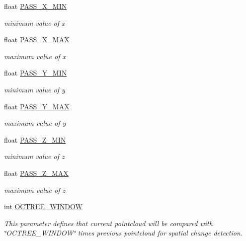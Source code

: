 \begin{DoxyCompactItemize}
float \hyperlink{classdatmo_1_1cloud__segmentation_a503bba212f9c15b767d512771b1559c2}{P\+A\+S\+S\+\_\+\+X\+\_\+\+M\+IN}
\begin{DoxyCompactList}\small\item\em minimum value of x \end{DoxyCompactList}\item 
float \hyperlink{classdatmo_1_1cloud__segmentation_a12f8209c6640d67c23cac18b2d8b7964}{P\+A\+S\+S\+\_\+\+X\+\_\+\+M\+AX}
\begin{DoxyCompactList}\small\item\em maximum value of x \end{DoxyCompactList}\item 
float \hyperlink{classdatmo_1_1cloud__segmentation_af95645fb925c485f397321d6e07c4574}{P\+A\+S\+S\+\_\+\+Y\+\_\+\+M\+IN}
\begin{DoxyCompactList}\small\item\em minimum value of y \end{DoxyCompactList}\item 
float \hyperlink{classdatmo_1_1cloud__segmentation_abacc76df1e25e42d25c1822c2637fa00}{P\+A\+S\+S\+\_\+\+Y\+\_\+\+M\+AX}
\begin{DoxyCompactList}\small\item\em maximum value of y \end{DoxyCompactList}\item 
float \hyperlink{classdatmo_1_1cloud__segmentation_acb71ade7e486ad1cafe15c441903f3e0}{P\+A\+S\+S\+\_\+\+Z\+\_\+\+M\+IN}
\begin{DoxyCompactList}\small\item\em minimum value of z \end{DoxyCompactList}\item 
float \hyperlink{classdatmo_1_1cloud__segmentation_a05b70936af05654abb9b1924ab593d08}{P\+A\+S\+S\+\_\+\+Z\+\_\+\+M\+AX}
\begin{DoxyCompactList}\small\item\em maximum value of z \end{DoxyCompactList}\item 
int \hyperlink{classdatmo_1_1cloud__segmentation_ada1c6bd7f69249c5317cbe95969498e4}{O\+C\+T\+R\+E\+E\+\_\+\+W\+I\+N\+D\+OW}
\begin{DoxyCompactList}\small\item\em This parameter defines that current pointcloud will be compared with \char`\"{}\+O\+C\+T\+R\+E\+E\+\_\+\+W\+I\+N\+D\+O\+W\char`\"{} times previous pointcloud for spatial change detection. \end{DoxyCompactList}\item 

\end{DoxyCompactItemize}
